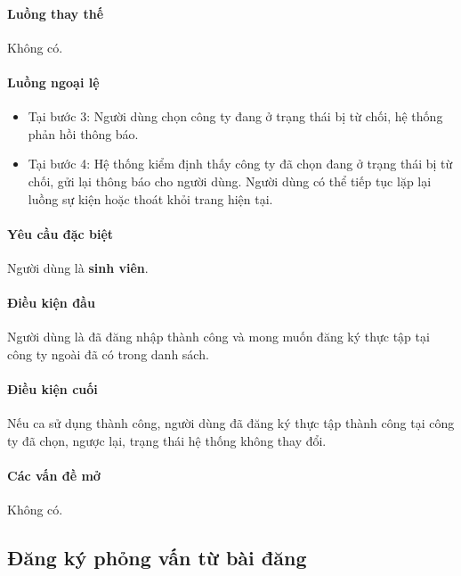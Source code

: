 \documentclass[./../main.tex]{subfiles}
\begin{document}
\paragraph*{Luồng thay thế} Không có.

\paragraph*{Luồng ngoại lệ}

\begin{itemize}
\item
  
  Tại bước 3: Người dùng chọn công ty đang ở trạng thái bị từ chối, hệ
  thống phản hồi thông báo.
  
\item
  
  Tại bước 4: Hệ thống kiểm định thấy công ty đã chọn đang ở trạng thái
  bị từ chối, gửi lại thông báo cho người dùng. Người dùng có thể tiếp
  tục lặp lại luồng sự kiện hoặc thoát khỏi trang hiện tại.
  
\end{itemize}

\paragraph*{Yêu cầu đặc biệt}

Người dùng là \textbf{sinh viên}.

\paragraph*{Điều kiện đầu}

Người dùng là đã đăng nhập thành công và mong muốn đăng ký thực tập tại
công ty ngoài đã có trong danh sách.

\paragraph*{Điều kiện cuối}

Nếu ca sử dụng thành công, người dùng đã đăng ký thực tập thành công tại
công ty đã chọn, ngược lại, trạng thái hệ thống không thay đổi.

\paragraph*{Các vấn đề mở}

Không có.

\subsection{Đăng ký phỏng vấn từ bài đăng}
\end{document}
